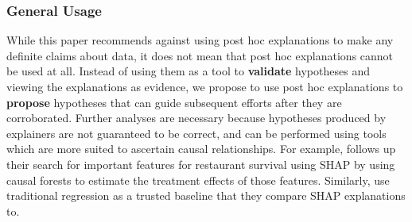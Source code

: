 \documentclass[12pt]{article}  %
\newcommand{\tw}[1]{\textcolor{red}{Tong: #1}}
\begin{document}
    \subsubsection{General Usage}
      While this paper recommends against using post hoc explanations to make any definite claims about data, it does not mean that post hoc explanations cannot be used at all. Instead of using them as a tool to \textbf{validate} hypotheses and viewing the explanations as evidence, we propose to use post hoc explanations to \textbf{propose} hypotheses that can guide subsequent efforts after they are corroborated.  %
     Further analyses are necessary because hypotheses produced by explainers are not guaranteed to be correct, and can be performed using tools which are more suited to ascertain causal relationships. For example,  \cite{zhang2023can} follows up their search for important features for restaurant survival using SHAP by using causal forests to estimate the treatment effects of those features. Similarly, \cite{hanauer22boosting} use traditional regression as a trusted baseline that they compare SHAP explanations to. 
    
\end{document}
